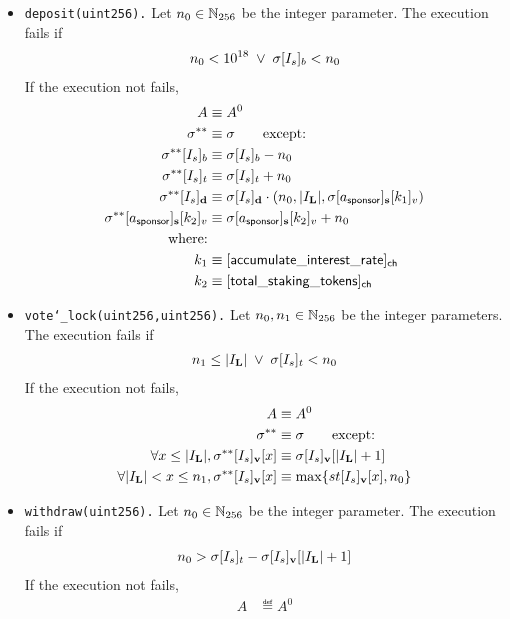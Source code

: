 \begin{itemize}
	\item {\tt deposit(uint256).} Let $n_0\in \mathbb{N}_{256}$ be the integer parameter. The execution fails if 
	\begin{align}
		n_0 < 10^{18} \;\vee\; \mathbf{\sigma}[I_s]_b<n_0
	\end{align}
	If the execution not fails, 
	\begin{align}
		A & \eqdef A^0 \\
		\st^{**} &\eqdef \st \qquad \mbox{except:}\\
		\st^{**}[I_s]_b &\eqdef \st[I_s]_b - n_0\\ 
		\st^{**}[I_s]_t &\eqdef \st[I_s]_t + n_0\\ 
		\st^{**}[I_s]_{\bf d} &\eqdef \st[I_s]_{\bf d} \cdot (n_0,|I_\mathbf{L}|,\st[a_{\sf sponsor}]_{\bf s}[k_1]_v) \\
		\st^{**}[a_{\sf sponsor}]_{\bf s}[k_2]_v & \eqdef\st[a_{\sf sponsor}]_{\bf s}[k_2]_v + n_0 \\
		\mbox{where:}& \\
		k_1 & \eqdef [{\sf accumulate\char`_interest\char`_rate}]_{\sf ch} \\
		k_2 & \eqdef [{\sf total\char`_staking\char`_tokens}]_{\sf ch}
	\end{align}
	\item {\tt vote\char`_lock(uint256,uint256).} Let $n_0,n_1\in \mathbb{N}_{256}$ be the integer parameters. The execution fails if 
	\begin{align}
		n_1 \le  |I_\mathbf{L}| \;\vee\; \mathbf{\sigma}[I_s]_t<n_0
	\end{align}
	If the execution not fails, 
	\begin{align}
		A & \equiv A^0 \\
		\mathbf{\sigma}^{**} &\equiv \mathbf{\sigma} \qquad \mbox{except:}\\
		\forall x\le |I_\mathbf{L}|, \mathbf{\sigma}^{**}[I_s]_{\bf v}[x] &\equiv \mathbf{\sigma}[I_s]_{\bf v}[|I_\mathbf{L}|+1]\\ 
		\forall |I_\mathbf{L}|<x\le n_1, \mathbf{\sigma}^{**}[I_s]_{\bf v}[x] &\equiv \max\{st[I_s]_{\bf v}[x],n_0\}
	\end{align}
	\item {\tt withdraw(uint256).} Let $n_0 \in \mathbb{N}_{256}$ be the integer parameter. The execution fails if 
	\begin{align}
		n_0>\mathbf{\sigma}[I_s]_t - \mathbf{\sigma}[I_s]_{\bf v}[|I_\mathbf{L}|+1]
	\end{align}
	If the execution not fails, 
	\begin{align}
		A & \eqdef A^0 \\

\end{align}
\end{itemize}
